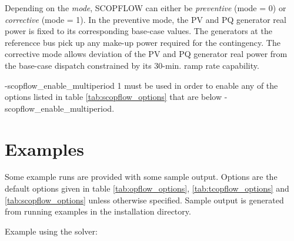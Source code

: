 Depending on the \emph{mode}, SCOPFLOW can either be \emph{preventive} (mode = 0) or \emph{corrective} (mode = 1). In the preventive mode, the PV and PQ generator real power is fixed to its corresponding base-case values. The generators at the referencce bus pick up any make-up power required for the contingency. The corrective mode allows deviation of the PV and PQ generator real power from the base-case dispatch constrained by its 30-min. ramp rate capability.

-scopflow\_enable\_multiperiod 1 must be used in order to enable any of the options listed in table \ref{tab:scopflow_options} that are below -scopflow\_enable\_multiperiod.

\section{Examples}

Some \scopflow example runs are provided with some sample output. Options are the default options given in table \ref{tab:opflow_options}, \ref{tab:tcopflow_options} and \ref{tab:scopflow_options} unless otherwise specified. Sample output is generated from running examples in the installation directory.

Example using the \ipopt solver:

